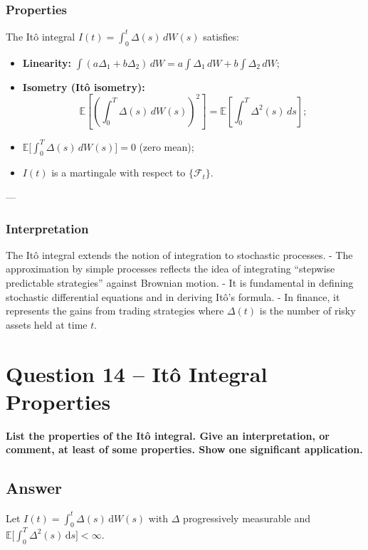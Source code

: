 \documentclass[12pt,a4paper]{book}
\theoremstyle{remark}
\newcommand{\EE}{\mathbb{E}}          %
\newcommand{\F}{\mathcal{F}}          %
\newcommand{\dd}{\mathrm{d}}
\begin{document}
\subsubsection*{Properties}
The Itô integral $I(t)=\int_0^t \Delta(s)\,dW(s)$ satisfies:
\begin{itemize}
    \item \textbf{Linearity:} $\int (a\Delta_1+b\Delta_2)\,dW = a\int\Delta_1\,dW + b\int\Delta_2\,dW$;
    \item \textbf{Isometry (Itô isometry):}
    \[
    \EE\!\left[\left(\int_0^T \Delta(s)\,dW(s)\right)^2\right] = \EE\!\left[\int_0^T \Delta^2(s)\,ds\right];
    \]
    \item $\EE\!\big[\int_0^T \Delta(s)\,dW(s)\big] = 0$ (zero mean);
    \item $I(t)$ is a martingale with respect to $\{\F_t\}$.
\end{itemize}

---

\subsubsection*{Interpretation}
The Itô integral extends the notion of integration to stochastic processes.  
- The approximation by simple processes reflects the idea of integrating “stepwise predictable strategies” against Brownian motion.  
- It is fundamental in defining stochastic differential equations and in deriving Itô’s formula.  
- In finance, it represents the gains from trading strategies where $\Delta(t)$ is the number of risky assets held at time $t$.







\newpage
\section{Question 14 -- Itô Integral Properties}
\textbf{List the properties of the It\^o integral. Give an interpretation, or comment, at least of some properties. Show one significant application.}

\subsection*{Answer}

Let $I(t)=\int_0^t \Delta(s)\,\dd W(s)$ with $\Delta$ progressively measurable and $\EE\!\big[\int_0^T \Delta^2(s)\,\dd s\big]<\infty$.
\end{document}
